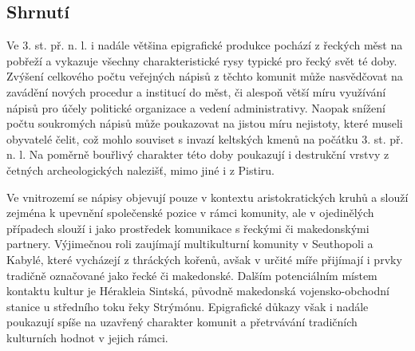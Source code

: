 
\subsection[shrnutí-9]{Shrnutí}

Ve 3. st. př. n. l. i nadále většina epigrafické produkce pochází z řeckých měst na pobřeží a vykazuje všechny charakteristické rysy typické pro řecký svět té doby. Zvýšení celkového počtu veřejných nápisů z těchto komunit může nasvědčovat na zavádění nových procedur a institucí do měst, či alespoň větší míru využívání nápisů pro účely politické organizace a vedení administrativy. Naopak snížení počtu soukromých nápisů může poukazovat na jistou míru nejistoty, které museli obyvatelé čelit, což mohlo souviset s invazí keltských kmenů na počátku 3. st. př. n. l. Na poměrně bouřlivý charakter této doby poukazují i destrukční vrstvy z četných archeologických nalezišť, mimo jiné i z Pistiru.

Ve vnitrozemí se nápisy objevují pouze v kontextu aristokratických kruhů a slouží zejména k upevnění společenské pozice v rámci komunity, ale v ojedinělých případech slouží i jako prostředek komunikace s řeckými či makedonskými partnery. Výjimečnou roli zaujímají multikulturní komunity v Seuthopoli a Kabylé, které vycházejí z thráckých kořenů, avšak v určité míře přijímají i prvky tradičně označované jako řecké či makedonské. Dalším potenciálním místem kontaktu kultur je Hérakleia Sintská, původně makedonská vojensko-obchodní stanice u středního toku řeky Strýmónu. Epigrafické důkazy však i nadále poukazují spíše na uzavřený charakter komunit a přetrvávání tradičních kulturních hodnot v jejich rámci.

